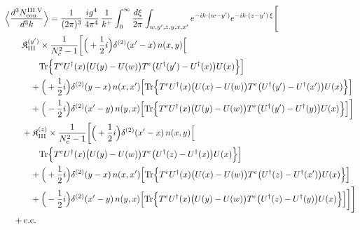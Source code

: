 \begingroup\small
\begin{align}\label{eq:S-III.V-2}
&\Big\langle\frac{d^{3}N^{\rm III.V}_{{\rm con}}}{d^{3}k}\Big\rangle=\frac{1}{(2\pi)^{3}}\, \frac{ig^{4}}{4\pi^{4}}\, \frac{1}{k^{+}} \int_{0}^{\infty}\frac{d\xi}{2\pi} \int_{w,y',z,y,x,x'}e^{-ik\cdot(w-y')}e^{-ik\cdot(z-y')\,\xi}\Bigg[\notag\\
&\quad\quad \mathfrak{K}^{(y')}_{\rm III} \times \frac{1}{N_{c}^{2}-1}\bigg[\Big(+\frac{1}{2}i\Big)\delta^{(2)}(x'-x)\, n(x,y)\Big[\notag\\
&\quad\quad\quad\quad {\rm Tr}\Big\{T^{e}U^{\dagger}(x)\big(U(y)-U(w)\big)T^{e}\big(U^{\dagger}(y')-U^{\dagger}(x)\big)U(x)\Big\}\Big]\notag\\
&\quad\quad\quad +\Big(+\frac{1}{2}i\Big)\delta^{(2)}(y-x)\, n(x,x')\Big[ {\rm Tr}\Big\{T^{e}U^{\dagger}(x)\big(U(x)-U(w)\big)T^{e}\big(U^{\dagger}(y')-U^{\dagger}(x')\big)U(x)\Big\}\Big]\notag\\
&\quad\quad\quad +\Big(-\frac{1}{2}i\Big)\delta^{(2)}(x'-y)\, n(y,x)\Big[ {\rm Tr}\Big\{T^{e}U^{\dagger}(x)\big(U(y)-U(w)\big)T^{e}\big(U^{\dagger}(y')-U^{\dagger}(y)\big)U(x)\Big\}\Big]\bigg]\notag\\
&\quad\quad + \mathfrak{K}^{(z)}_{\rm III} \times \frac{1}{N_{c}^{2}-1}\bigg[\Big(+\frac{1}{2}i\Big)\delta^{(2)}(x'-x)\, n(x,y)\Big[\notag\\
&\quad\quad\quad\quad {\rm Tr}\Big\{T^{e}U^{\dagger}(x)\big(U(y)-U(w)\big)T^{e}\big(U^{\dagger}(z)-U^{\dagger}(x)\big)U(x)\Big\}\Big]\notag\\
&\quad\quad\quad +\Big(+\frac{1}{2}i\Big)\delta^{(2)}(y-x)\, n(x,x')\Big[ {\rm Tr}\Big\{T^{e}U^{\dagger}(x)\big(U(x)-U(w)\big)T^{e}\big(U^{\dagger}(z)-U^{\dagger}(x')\big)U(x)\Big\}\Big]\notag\\
&\quad\quad\quad +\Big(-\frac{1}{2}i\Big)\delta^{(2)}(x'-y)\, n(y,x)\Big[ {\rm Tr}\Big\{T^{e}U^{\dagger}(x)\big(U(y)-U(w)\big)T^{e}\big(U^{\dagger}(z)-U^{\dagger}(y)\big)U(x)\Big\}\Big]\bigg]\Bigg]\notag\\
&\quad +{\rm c.c.}
\end{align}
\endgroup
